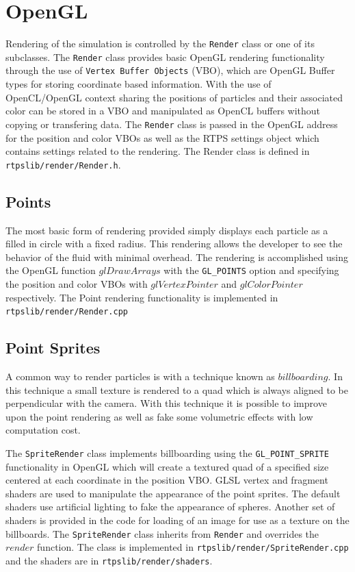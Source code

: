 \section{OpenGL}

Rendering of the simulation is controlled by the \verb|Render| class or one of
its subclasses. The \verb|Render| class provides basic OpenGL rendering
functionality through the use of \verb|Vertex Buffer Objects| (VBO), which are OpenGL
Buffer types for storing coordinate based information. With the use of
OpenCL/OpenGL context sharing the positions of particles and their associated
color can be stored in a VBO and manipulated as OpenCL buffers without copying
or transfering data. The \verb|Render| class is passed in the OpenGL address
for the position and color VBOs as well as the RTPS settings object which
contains settings related to the rendering. The Render class is defined in
\verb|rtpslib/render/Render.h|.


\subsection{Points}
The most basic form of rendering provided simply displays each particle as a
filled in circle with a fixed radius. This rendering allows the developer to
see the behavior of the fluid with minimal overhead. The rendering is
accomplished using the OpenGL function $glDrawArrays$ with the \verb|GL_POINTS|
option and specifying the position and color VBOs with $glVertexPointer$ and
$glColorPointer$ respectively. The Point rendering functionality is implemented
in \verb|rtpslib/render/Render.cpp|

\subsection{Point Sprites}
A common way to render particles is with a technique known as $billboarding$.
In this technique a small texture is rendered to a quad which is always aligned
to be perpendicular with the camera. With this technique it is possible to
improve upon the point rendering as well as fake some volumetric effects with
low computation cost.


The \verb|SpriteRender| class implements billboarding using the
\verb|GL_POINT_SPRITE| functionality in OpenGL which will create a textured quad
of a specified size centered at each coordinate in the position VBO. GLSL
vertex and fragment shaders are used to manipulate the appearance of the point
sprites. The default shaders use artificial lighting to fake the appearance of
spheres. Another set of shaders is provided in the code for loading of an image
for use as a texture on the billboards. The \verb|SpriteRender| class inherits
from \verb|Render| and overrides the $render$ function. The class is
implemented in \verb|rtpslib/render/SpriteRender.cpp| and the shaders are in
\verb|rtpslib/render/shaders|.


